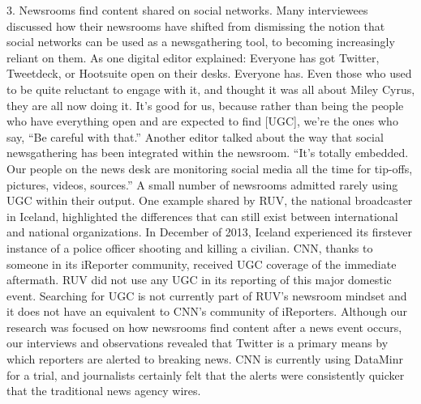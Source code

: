 \begin{enumerate}
3. Newsrooms find content shared on social networks.
Many interviewees discussed how their newsrooms have shifted from dismissing
the notion that social networks can be used as a newsgathering tool,
to becoming increasingly reliant on them. As one digital editor explained:
Everyone has got Twitter, Tweetdeck, or Hootsuite open on their
desks. Everyone has. Even those who used to be quite reluctant to
engage with it, and thought it was all about Miley Cyrus, they are all
now doing it. It's good for us, because rather than being the people
who have everything open and are expected to find [UGC], we're the
ones who say, ``Be careful with that.''
Another editor talked about the way that social newsgathering has been
integrated within the newsroom. ``It's totally embedded. Our people on the
news desk are monitoring social media all the time for tip-offs, pictures,
videos, sources.''
A small number of newsrooms admitted rarely using UGC within their
output. One example shared by RUV, the national broadcaster in Iceland,
highlighted the differences that can still exist between international and
national organizations. In December of 2013, Iceland experienced its firstever
instance of a police officer shooting and killing a civilian. CNN, thanks
to someone in its iReporter community, received UGC coverage of the
immediate aftermath. RUV did not use any UGC in its reporting of this
major domestic event. Searching for UGC is not currently part of RUV's
newsroom mindset and it does not have an equivalent to CNN's community
of iReporters.
Although our research was focused on how newsrooms find content after
a news event occurs, our interviews and observations revealed that Twitter
is a primary means by which reporters are alerted to breaking news. CNN
is currently using DataMinr for a trial, and journalists certainly felt that
the alerts were consistently quicker that the traditional news agency wires.


\end{enumerate}
